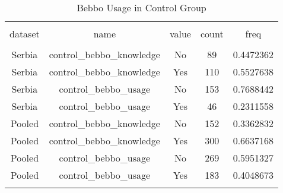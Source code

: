 
\begin{table}[!htbp] \centering 
  \caption{Bebbo Usage in Control Group} 
  \label{tbl:Bebbo Usage in Control Group} 
\begin{tabular}{@{\extracolsep{5pt}} ccccc} 
\\[-1.8ex]\hline 
\hline \\[-1.8ex] 
dataset & name & value & count & freq \\ 
\hline \\[-1.8ex] 
Serbia & control\_bebbo\_knowledge & No &  89 & 0.4472362 \\ 
Serbia & control\_bebbo\_knowledge & Yes & 110 & 0.5527638 \\ 
Serbia & control\_bebbo\_usage & No & 153 & 0.7688442 \\ 
Serbia & control\_bebbo\_usage & Yes &  46 & 0.2311558 \\ 
Pooled & control\_bebbo\_knowledge & No & 152 & 0.3362832 \\ 
Pooled & control\_bebbo\_knowledge & Yes & 300 & 0.6637168 \\ 
Pooled & control\_bebbo\_usage & No & 269 & 0.5951327 \\ 
Pooled & control\_bebbo\_usage & Yes & 183 & 0.4048673 \\ 
\hline \\[-1.8ex] 
\end{tabular} 
\end{table} 
